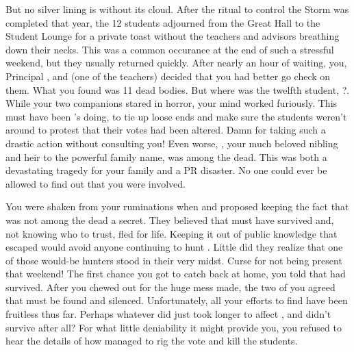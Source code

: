 \documentclass[char]{GL2020}
\begin{document}
But no silver lining is without its cloud. After the ritual to control the Storm was completed that year, the 12 students adjourned from the Great Hall to the Student Lounge for a private toast without the teachers and advisors breathing down their necks. This was a common occurance at the end of such a stressful weekend, but they usually returned quickly. After nearly an hour of waiting, you, Principal \cPrincipal{\intro}, and \cMusic{\intro} (one of the teachers) decided that you had better go check on them. What you found was 11 dead bodies. But where was the twelfth student, \cKidScientist{\intro}?. While your two companions stared in horror, your mind worked furiously. This must have been \cEvil{}'s doing, to tie up loose ends and make sure the students weren't around to protest that their votes had been altered. Damn \cEvil{\them} for taking such a drastic action without consulting you! Even worse, \cHeirSibling{\intro}, your much beloved nibling and heir to the powerful family name, was among the dead. This was both a devastating tragedy for your family and a PR disaster. No one could ever be allowed to find out that you were involved. 

You were shaken from your ruminations when \cPrincipal{} and \cMusic{} proposed keeping the fact that \cKidScientist{} was not among the dead a secret. They believed that \cKidScientist{} must have survived and, not knowing who to trust, fled for \cKidScientist{\their} life. Keeping it out of public knowledge that \cKidScientist{\they} escaped would avoid anyone continuing to hunt \cKidScientist{\them}. Little did they realize that one of those would-be hunters stood in their very midst. Curse \cEvil{} for not being present that weekend! The first chance you got to catch \cEvil{} back at home, you told \cEvil{\them} that \cKidScientist{} had survived. After you chewed \cEvil{\them} out for the huge mess \cEvil{\they} made, the two of you agreed that \cKidScientist{\they} must be found and silenced. Unfortunately, all your efforts to find \cKidScientist{\them} have been fruitless thus far. Perhaps whatever \cEvil{} did just took longer to affect \cKidScientist{}, and \cKidScientist{\they} didn't survive after all? For what little deniability it might provide you, you refused to hear the details of how \cEvil{} managed to rig the vote and kill the students.
\end{document}

